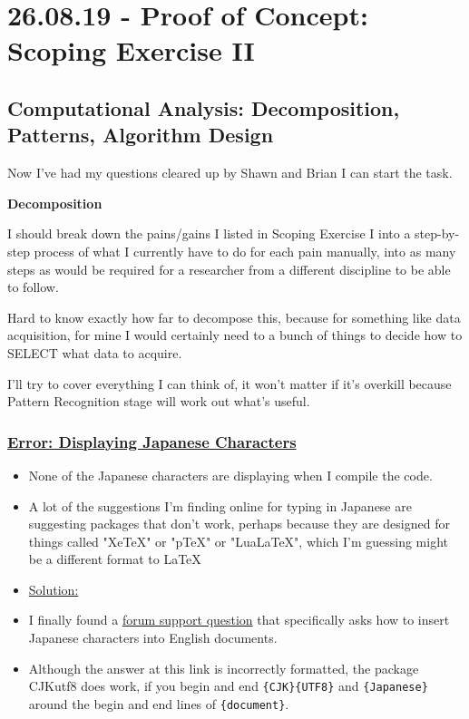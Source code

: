 \documentclass[12pt]{article}
\begin{document}
\newpage\section{26.08.19 - Proof of Concept: Scoping Exercise II}
\subsection{Computational Analysis: Decomposition, Patterns, Algorithm Design}
Now I've had my questions cleared up by Shawn and Brian I can start the task. 

\textbf{Decomposition}

I should break down the pains/gains I listed in Scoping Exercise I into a step-by-step process of what I currently have to do for each pain manually, into as many steps as would be required for a researcher from a different discipline to be able to follow. 

Hard to know exactly how far to decompose this, because for something like data acquisition, for mine I would certainly need to a bunch of things to decide how to SELECT what data to acquire. 

I'll try to cover everything I can think of, it won't matter if it's overkill because Pattern Recognition stage will work out what's useful.

\subsubsection{\texorpdfstring{\underline{Error: Displaying Japanese Characters}}{}}\label{error:er11}
\begin{itemize}
    \item None of the Japanese characters are displaying when I compile the code.
    \item A lot of the suggestions I'm finding online for typing in Japanese are suggesting packages that don't work, perhaps because they are designed for things called "XeTeX" or "pTeX" or "LuaLaTeX", which I'm guessing might be a different format to LaTeX
\end{itemize}
\begin{itemize}
\renewcommand{\labelitemi}{}
\item \underline{Solution:}
\renewcommand{\labelitemi}{$\bullet$}
    \item I finally found a \href{https://tex.stackexchange.com/questions/68333/how-to-put-japanese-kanji-characters-into-an-english-document}{forum support question} that specifically asks how to insert Japanese characters into English documents.
    \item Although the answer at this link is incorrectly formatted, the package CJKutf8 does work, if you begin and end \texttt{\{CJK\}\{UTF8\}} and \texttt{\{Japanese\}} around the begin and end lines of \texttt{\{document\}}.
\end{itemize}
\end{document}
